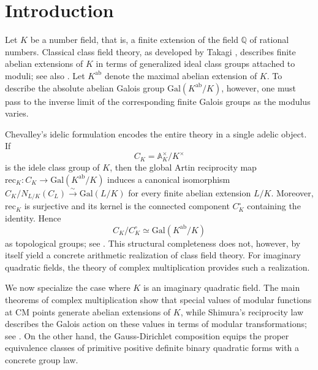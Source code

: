 \documentclass[reqno,11pt]{article}
\theoremstyle{plain} %
\theoremstyle{definition} %
\begin{document}
\tableofcontents


\section {Introduction}

Let $K$ be a number field, that is, a
finite extension of the field $\mathbb{Q}$ of
rational numbers. Classical class field theory, 
as developed by Takagi \cite{Takagi}, 
describes finite abelian extensions of $K$ in terms of 
generalized ideal class groups attached to moduli;
see also \cite{Janusz}.
Let $K^\mathrm{ab}$ denote the maximal abelian extension of $K$. 
To describe the absolute abelian Galois group $\mathrm{Gal}(K^\mathrm{ab}/K)$, however,
one must pass to the inverse limit of the
corresponding finite Galois groups as the modulus varies.
\par
Chevalley's idelic formulation encodes the entire
theory in a single adelic object.  If
\begin{equation*}
C_K=\mathbb{A}_K^{\times}/K^{\times}
\end{equation*}
is the idele class group of $K$, then 
the global Artin reciprocity map $\mathrm{rec}_K:C_K\rightarrow\mathrm{Gal}(K^\mathrm{ab}/K)$
induces a canonical isomorphism
$C_K/N_{L/K}(C_L)\stackrel{\sim}{\rightarrow}\mathrm{Gal}(L/K)$
for every finite abelian extension $L/K$. 
Moreover, $\mathrm{rec}_K$ is surjective and its kernel is the 
connected component $C_K^\circ$ containing the identity. Hence
\begin{equation*}
 C_K/C_K^\circ\simeq\mathrm{Gal}(K^\mathrm{ab}/K)
\end{equation*}
as topological groups; see \cite{Chevalley, Milne, Neukirch}.  
This structural completeness does not, however, 
by itself yield a concrete arithmetic realization of class field theory.
For imaginary quadratic fields, the theory of complex multiplication provides
such a realization. 
\par
We now specialize the case
where $K$ is an imaginary quadratic field. 
The main theorems of complex multiplication show
that special values of modular functions at CM points 
generate abelian extensions of $K$, while
Shimura's reciprocity law describes 
the Galois action on these values
in terms of modular transformations;
see \cite{Deuring, Hasse, Shimura, Stevenhagen}. 
On the other hand, 
the Gauss-Dirichlet composition \cite{Dirichlet, Gauss}
equips the proper equivalence classes of primitive positive definite binary quadratic forms
with a concrete group law.
\end{document}
